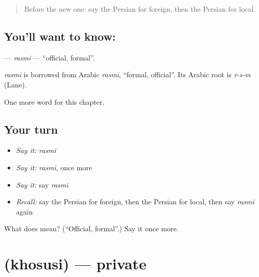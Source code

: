 \label{lesson:FA-C271-rasmi}



\begin{quote}
Before the new one: say the Persian for foreign, then the Persian for local.
\end{quote}

\subsection*{You'll want to know: }
\textbf{} — \emph{rasmi} — \textquotedblleft{}official, formal\textquotedblright{}.

\begin{cousinweb}
\emph{rasmi} is borrowed from Arabic \emph{rasmī}, \textquotedblleft{}formal, official\textquotedblright{}. Its Arabic root is \emph{r-s-m} (Lane).
\end{cousinweb}

\begin{grammarlens}[title={What you've built}]
One more word for this chapter.
\end{grammarlens}

\subsection*{Your turn}
\begin{itemize}
\raggedright
  \item \emph{Say it:} \emph{rasmi}
  \item \emph{Say it:} \emph{rasmi}, once more
  \item \emph{Say it:} say \emph{rasmi}
  \item \emph{Recall:} say the Persian for foreign, then the Persian for local, then say \emph{rasmi} again
\end{itemize}

\begin{tcolorbox}[breakable,colback=teal!4,colframe=teal!35!black,title={Before you move on}]
What does  mean? (\textquotedblleft{}Official, formal\textquotedblright{}.) Say it once more.
\end{tcolorbox}
\section[\texorpdfstring{\fa{خصوصی} (khosusi)}{خصوصی (khosusi)}]{ (khosusi) — private}

\label{lesson:FA-C271-khosusi}



